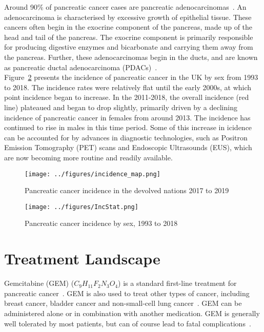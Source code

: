 Around 90\% of pancreatic cancer cases are pancreatic adenocarcinomas~\cite{pishvaian}. An adenocarcinoma is characterised by excessive growth of epithelial tissue. These cancers often begin in the exocrine component of the pancreas, made up of the head and tail of the pancreas. The exocrine component is primarily responsible for producing digestive enzymes and bicarbonate and carrying them away from the pancreas. Further, these adenocarcinomas begin in the ducts, and are known as pancreatic ductal adenocarcinoma (PDACs)~\cite{neoptolemos}. \\

Figure~\ref{pancInc} presents the incidence of pancreatic cancer in the UK by sex from 1993 to 2018. The incidence rates were relatively flat until the early 2000s, at which point incidence began to increase. In the 2011-2018, the overall incidence (red line) plateaued and began to drop slightly, primarily driven by a declining incidence of pancreatic cancer in females from around 2013. The incidence has continued to rise in males in this time period. Some of this increase in icidence can be accounted for by advances in diagnostic technologies, such as Positron Emission Tomography (PET) scans and Endoscopic Ultrasounds (EUS), which are now becoming more routine and readily available. \\

\begin{figure}[h]
    \centering
    \texttt{[image: ../figures/incidence\_map.png]}
    \caption{Pancreatic cancer incidence in the devolved nations 2017 to 2019}
    \label{pancIncMap}
\end{figure}

\begin{figure}[h]
    \centering
    \texttt{[image: ../figures/IncStat.png]}
    \caption{Pancreatic cancer incidence by sex, 1993 to 2018}
    \label{pancInc}
\end{figure}

\section{Treatment Landscape}
Gemcitabine (GEM) ($C_9H_{11}F_2N_3O_4$) is a standard first-line treatment for pancreatic cancer~\cite{TA25}. GEM is also used to treat other types of cancer, including breast cancer, bladder cancer and non-small-cell lung cancer~\cite{wong2009}. GEM can be administered alone or in combination with another medication. GEM is generally well tolerated by most patients, but can of course lead to fatal complications~\cite{hryciuk}.  \\

